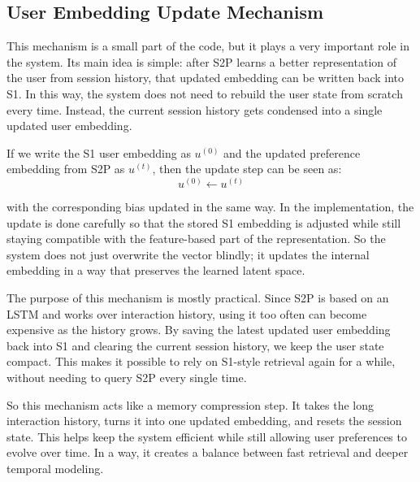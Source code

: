 


\subsection{User Embedding Update Mechanism}

This mechanism is a small part of the code, but it plays a very important role in the system. 
Its main idea is simple: after S2P learns a better representation of the user from session history, 
that updated embedding can be written back into S1. 
In this way, the system does not need to rebuild the user state from scratch every time. 
Instead, the current session history gets condensed into a single updated user embedding.

If we write the S1 user embedding as $u^{(0)}$ and the updated preference embedding from S2P as $u^{(t)}$, 
then the update step can be seen as:
\begin{equation}
    u^{(0)} \leftarrow u^{(t)}
\end{equation}

with the corresponding bias updated in the same way. 
In the implementation, the update is done carefully so that the stored S1 embedding is adjusted while still staying compatible with the feature-based part of the representation. 
So the system does not just overwrite the vector blindly; it updates the internal embedding in a way that preserves the learned latent space. 

The purpose of this mechanism is mostly practical. 
Since S2P is based on an LSTM and works over interaction history, using it too often can become expensive as the history grows. 
By saving the latest updated user embedding back into S1 and clearing the current session history, we keep the user state compact. 
This makes it possible to rely on S1-style retrieval again for a while, without needing to query S2P every single time.

So this mechanism acts like a memory compression step. 
It takes the long interaction history, turns it into one updated embedding, and resets the session state. 
This helps keep the system efficient while still allowing user preferences to evolve over time. 
In a way, it creates a balance between fast retrieval and deeper temporal modeling.


